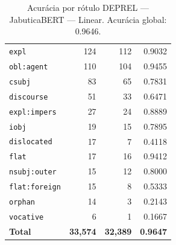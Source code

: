 \begin{table}[ht]
\begin{tabular}{lrrr}
\texttt{expl} & 124 & 112 & 0.9032 \\
\texttt{obl\!:\!agent} & 110 & 104 & 0.9455 \\
\texttt{csubj} & 83 & 65 & 0.7831 \\
\texttt{discourse} & 51 & 33 & 0.6471 \\
\texttt{expl\!:\!impers} & 27 & 24 & 0.8889 \\
\texttt{iobj} & 19 & 15 & 0.7895 \\
\texttt{dislocated} & 17 & 7 & 0.4118 \\
\texttt{flat} & 17 & 16 & 0.9412 \\
\texttt{nsubj\!:\!outer} & 15 & 12 & 0.8000 \\
\texttt{flat\!:\!foreign} & 15 & 8 & 0.5333 \\
\texttt{orphan} & 14 & 3 & 0.2143 \\
\texttt{vocative} & 6 & 1 & 0.1667 \\
\midrule
\textbf{Total} & \textbf{33,574} & \textbf{32,389} & \textbf{0.9647} \\
\bottomrule
\end{tabular}
\caption{Acurácia por rótulo DEPREL — JabuticaBERT — Linear. Acurácia global: 0.9646.}
\label{tab:deprel-acc-predict-test-df-jabuticabert-linear}
\end{table}

